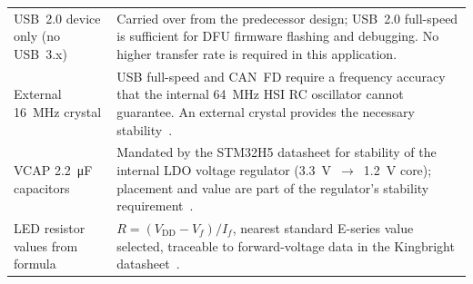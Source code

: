 \begin{longtable}{p{} p{}}
  USB~2.0 device only (no USB~3.x)
    & Carried over from the predecessor design; USB~2.0 full-speed is
      sufficient for DFU firmware flashing and debugging. No higher
      transfer rate is required in this application. \\[4pt]

  External \SI{16}{\mega\hertz} crystal
    & USB full-speed and CAN~FD require a frequency accuracy that the
      internal \SI{64}{\mega\hertz} HSI RC oscillator cannot
      guarantee. An external crystal provides the necessary
      stability~\cite{ref1}. \\[4pt]

  VCAP \SI{2.2}{\micro\farad} capacitors
    & Mandated by the STM32H5 datasheet for stability of the internal
      LDO voltage regulator (\SI{3.3}{\volt}~$\rightarrow$~\SI{1.2}{\volt}
      core); placement and value are part of the regulator's stability
      requirement~\cite{ref1}. \\[4pt]

  LED resistor values from formula
    & $R = (V_\mathrm{DD} - V_f) / I_f$, nearest standard E-series
      value selected, traceable to forward-voltage data in the Kingbright
      datasheet~\cite{ref5}. \\

\end{longtable}
